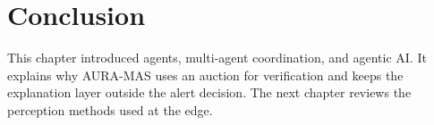 \section{Conclusion}

This chapter introduced agents, multi-agent coordination, and agentic AI. It explains why AURA-MAS uses an auction for verification and keeps the explanation layer outside the alert decision. The next chapter reviews the perception methods used at the edge.
